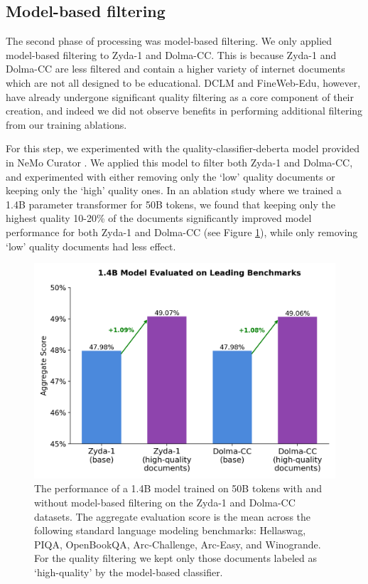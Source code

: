 \documentclass[conference]{IEEEtran}
\begin{document}
\subsection{Model-based filtering}

The second phase of processing was model-based filtering. We only applied model-based filtering to Zyda-1 and Dolma-CC. This is because Zyda-1 and Dolma-CC are less filtered and contain a higher variety of internet documents which are not all designed to be educational. DCLM and FineWeb-Edu, however, have already undergone significant quality filtering as a core component of their creation, and indeed we did not observe benefits in performing additional filtering from our training ablations.

For this step, we experimented with the quality-classifier-deberta model provided in NeMo Curator \citep{nemo_curator}. We applied this model to filter both Zyda-1 and Dolma-CC, and experimented with either removing only the ‘low’ quality documents or keeping only the ‘high’ quality ones. In an ablation study where we trained a 1.4B parameter transformer for 50B tokens, we found that keeping only the highest quality 10-20\% of the documents significantly improved model performance for both Zyda-1 and Dolma-CC (see Figure \ref{fig:model_filtering_ablation}), while only removing ‘low’ quality documents had less effect.

\begin{figure}
    \centering
    \includegraphics[width=\linewidth]{figures/model_filtering_ablation.png}
    \caption{The performance of a 1.4B model trained on 50B tokens with and without model-based filtering on the Zyda-1 and Dolma-CC datasets. The aggregate evaluation score is the mean across the following standard language modeling benchmarks: Hellaswag, PIQA, OpenBookQA, Arc-Challenge, Arc-Easy, and Winogrande. For the quality filtering we kept only those documents labeled as `high-quality' by the model-based classifier.}
    \label{fig:model_filtering_ablation}
\end{figure}
\end{document}

